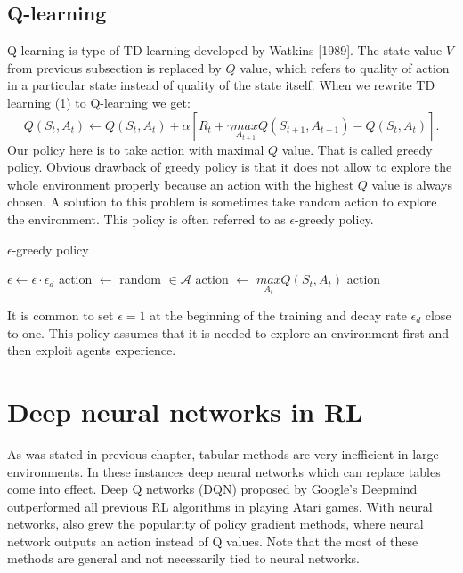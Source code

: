 \subsection{Q-learning}
Q-learning is type of TD learning developed by Watkins [1989]. The state value $V$ from previous subsection is replaced by $Q$ value, which refers to quality of action in a particular state instead of quality of the state itself. When we rewrite TD learning (1) to Q-learning we get:
\begin{equation}
Q(S_t, A_t) \gets Q(S_t, A_t) + \alpha [R_{t} + \gamma \underset{A_{t+1}}{max} Q(S_{t+1}, A_{t+1}) - Q(S_t, A_t)].
\end{equation}
Our policy here is to take action with maximal $Q$ value. That is called greedy policy. Obvious drawback of greedy policy is that it does not allow to explore the whole environment properly because an action with the highest $Q$ value is always chosen. A solution to this problem is sometimes take random action to explore the environment. This policy is often referred to as $\epsilon$-greedy policy.

\begin{algorithm}
\caption{$\epsilon$-greedy policy}\label{euclid}
\begin{algorithmic}[1]
\State $\epsilon \gets \epsilon \cdot \epsilon_d$
\State action $\gets$ random $\in \mathcal{A}$
\Else 
\State action $\gets$ $\underset{A_t}{max} Q(S_t, A_t)$
\EndIf
\State \Return action
\EndProcedure
\end{algorithmic}
\end{algorithm}

It is common to set $\epsilon = 1$ at the beginning of the training and decay rate $\epsilon_d$ close to one. This policy assumes that it is needed to explore an environment first and then exploit agents experience.

\clearpage
\section{Deep neural networks in RL}
As was stated in previous chapter, tabular methods are very inefficient in large environments. In these instances deep neural networks which can replace tables come into effect. Deep Q networks (DQN) proposed by Google’s Deepmind \cite{mnih2015} outperformed all previous RL algorithms in playing Atari games. With neural networks, also grew the popularity of policy gradient methods, where neural network outputs an action instead of Q values. Note that the most of these methods are general and not necessarily tied to neural networks.

